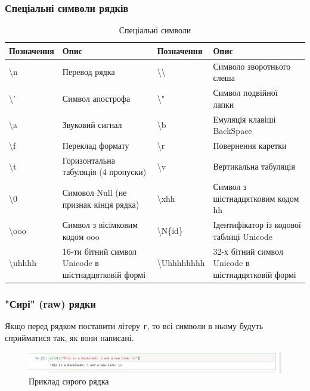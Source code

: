 \begin{frame}
\frametitle{Спеціальні символи рядків}
\tiny{
\begin{table}
  \caption{Спеціальні символи}
  \label{tab:}

  \begin{center}
    \begin{tabular}{|p{1.2cm}|p{3.5cm}|p{1.2cm}|p{3.5cm}|}
    \hline
     \textbf{Позначення}  & \textbf{Опис} & \textbf{Позначення}  & \textbf{Опис} \\
     \hline
      \textbackslash n & Перевод рядка & \textbackslash \textbackslash & Символо зворотнього слеша \\
     \hline
           \textbackslash ' & Символ апострофа & \textbackslash " & Символ подвійної лапки \\
     \hline
           \textbackslash a & Звуковий сигнал & \textbackslash b & Емуляція клавіші BackSpace \\
     \hline
           \textbackslash f & Переклад формату & \textbackslash r & Повернення каретки \\
     \hline
           \textbackslash t & Горизонтальна табуляція (4 пропуски) & \textbackslash v & Вертикальна табуляція \\
     \hline
           \textbackslash 0 & Симовол Null (не признак кінця рядка) & \textbackslash xhh & Символ з шістнадцятковим кодом hh \\
     \hline
           \textbackslash ooo & Символ з вісімковим кодом ooo  & \textbackslash N\{id\} & Ідентифікатор із кодової таблиці Unicode \\
     \hline
           \textbackslash uhhhh & 16-ти бітний символ Unicode в шістнадцятковій формі & \textbackslash Uhhhhhhhh &  32-х бітний символ Unicode в шістнадцятковій формі\\
     \hline
    \end{tabular}
  \end{center}
\end{table}
}
\end{frame}

\begin{frame}
\frametitle{"Сирі" (raw) рядки}
Якщо перед рядком поставити літеру \texttt{r}, то всі символи в ньому будуть сприйматися так, як вони написані.
\begin{figure}
\begin{center}
 \includegraphics[width=\textwidth]{pictures/raw_string.png}
\caption{Приклад сирого рядка}
\label{raw_string} 
\end{center}
\end{figure}
\end{frame}

